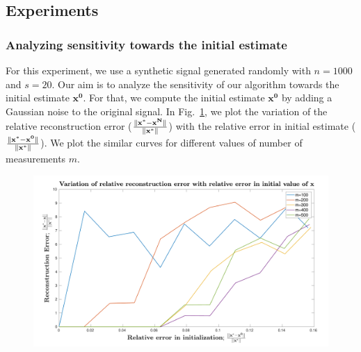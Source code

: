 \subsection{Experiments}

\subsubsection{Analyzing sensitivity towards the initial estimate}
For this experiment, we use a synthetic signal generated randomly with $n=1000$ and $s=20$. 
Our aim is to analyze the sensitivity of our algorithm towards the initial estimate $\mathbf{x^0}$. %
For that, we compute the initial estimate $\mathbf{x^0}$ by adding a Gaussian noise to the original signal. In Fig.~\ref{fig:pl}, we plot the variation of the relative reconstruction error ($\frac{\|\mathbf{x^*-x^N}\|}{\|\mathbf{x^*}\|}$) with the relative error in initial estimate ($\frac{\|\mathbf{x^*-x^0}\|}{\|\mathbf{x^*}\|}$). We plot the similar curves for different values of number of measurements $m$.
\begin{figure}[t]
	\begin{center}
		\includegraphics[width=\linewidth]{./fig/graph.pdf}
	\end{center}
	\caption{}
	\label{fig:pl}
\end{figure}


